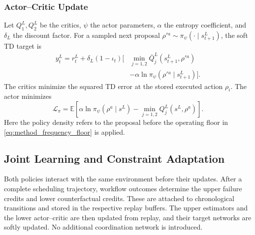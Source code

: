 \documentclass[lettersize,journal]{IEEEtran}
\begin{document}
\subsubsection{Actor--Critic Update}

Let $Q_1^L,Q_2^L$ be the critics, $\psi$ the actor parameters,
$\alpha$ the entropy coefficient, and $\delta_L$ the discount factor.
For a sampled next proposal $\rho'{}^a\sim\pi_\psi(\cdot\mid s_{t+1}^L)$,
the soft TD target is
\begin{align}
 y_t^L=r_t^L+\delta_L(1-\iota_t)\big[&\min_{j=1,2}
 \bar Q_j^L(s_{t+1}^L,\rho'{}^a)\nonumber\\
 &-\alpha\ln\pi_\psi(\rho'{}^a\mid s_{t+1}^L)\big].
 \label{eq:method_sac_target}
\end{align}
The critics minimize the squared TD error at the stored executed
action $\rho_i$. The actor minimizes
\begin{equation}
 \mathcal L_\pi=\mathbb E\!\left[
 \alpha\ln\pi_\psi(\rho^a\mid s^L)
 -\min_{j=1,2}Q_j^L(s^L,\rho^a)\right].
 \label{eq:method_sac_actor}
\end{equation}
Here the policy density refers to the proposal before the operating
floor in \eqref{eq:method_frequency_floor} is applied.

\subsection{Joint Learning and Constraint Adaptation}
\label{subsec:joint}

Both policies interact with the same environment before their updates.
After a complete scheduling trajectory, workflow outcomes determine
the upper failure credits and lower counterfactual credits. These are
attached to chronological transitions and stored in the respective
replay buffers. The upper estimators and the lower actor--critic are
then updated from replay, and their target networks are softly updated.
No additional coordination network is introduced.
\end{document}
